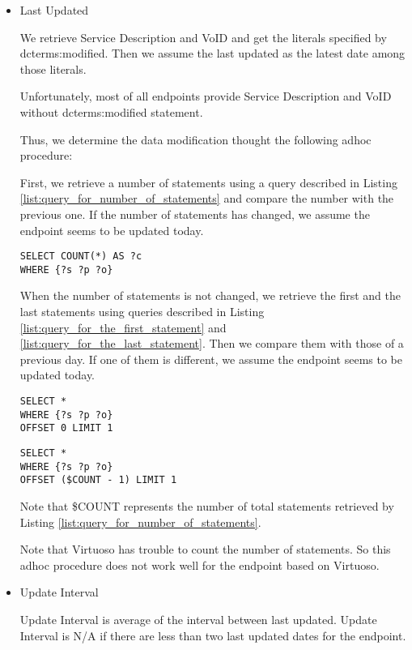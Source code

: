 \documentclass[11pt,a4paper]{article}
\begin{document}
\begin{itemize}
  \item Last Updated

  We retrieve Service Description and VoID and get the literals specified by dcterms:modified.
  Then we assume the last updated as the latest date among those literals.

  Unfortunately, most of all endpoints provide Service Description and VoID without dcterms:modified statement.

  Thus, we determine the data modification thought the following adhoc procedure:

  First, we retrieve a number of statements using a query described in Listing \ref{list:query_for_number_of_statements} and compare the number with the previous one. If the number of statements has changed, we assume the endpoint seems to be updated today.

  \begin{lstlisting}[basicstyle=\ttfamily\footnotesize,breaklines=true,frame=single,caption=A query for retrieving a number of statements,label=list:query_for_number_of_statements]
SELECT COUNT(*) AS ?c
WHERE {?s ?p ?o}
  \end{lstlisting}

  When the number of statements is not changed, we retrieve the first and the last statements using queries described in Listing \ref{list:query_for_the_first_statement} and \ref{list:query_for_the_last_statement}.
  Then we compare them with those of a previous day. If one of them is different, we assume the endpoint seems to be updated today.

  \begin{lstlisting}[basicstyle=\ttfamily\footnotesize,breaklines=true,frame=single,caption=A query for the first statement,label=list:query_for_the_first_statement]
SELECT *
WHERE {?s ?p ?o}
OFFSET 0 LIMIT 1
  \end{lstlisting}

  \begin{lstlisting}[basicstyle=\ttfamily\footnotesize,breaklines=true,frame=single,caption=A query for the last statement,label=list:query_for_the_last_statement]
SELECT *
WHERE {?s ?p ?o}
OFFSET ($COUNT - 1) LIMIT 1
  \end{lstlisting}

  Note that \$COUNT represents the number of total statements retrieved by Listing \ref{list:query_for_number_of_statements}.

  Note that Virtuoso has trouble to count the number of statements. So this adhoc procedure does not work well for the endpoint based on Virtuoso.

  \item Update Interval

  Update Interval is average of the interval between last updated.
  Update Interval is N/A if there are less than two last updated dates for the endpoint.

\end{itemize}
\end{document}
